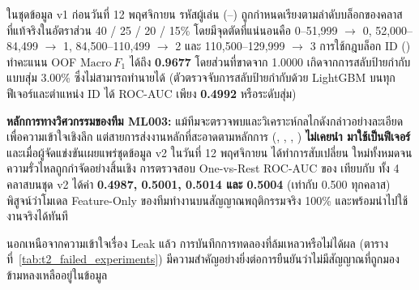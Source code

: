 \begin{warningbox}
ในชุดข้อมูล v1 ก่อนวันที่ 12 พฤศจิกายน รหัสผู้เล่น  (--) ถูกกำหนดเรียงตามลำดับบล็อกของคลาสที่แท้จริงในอัตราส่วน 40 / 25 / 20 / 15\% โดยมีจุดตัดที่แน่นอนคือ 0--51,999 $\to$ 0, 52,000--84,499 $\to$ 1, 84,500--110,499 $\to$ 2 และ 110,500--129,999 $\to$ 3 การใช้กฎบล็อก ID () ทำคะแนน OOF $\mathrm{Macro}\ F_1$ ได้ถึง \textbf{0.9677} โดยส่วนที่ขาดจาก 1.0000 เกิดจากการสลับป้ายกำกับแบบสุ่ม 3.00\% ซึ่งไม่สามารถทำนายได้ (ตัวตรวจจับการสลับป้ายกำกับด้วย LightGBM บนทุกฟีเจอร์และตำแหน่ง ID ได้ ROC-AUC เพียง \textbf{0.4992} หรือระดับสุ่ม)

\textbf{หลักการทางวิศวกรรมของทีม ML003:} แม้ทีมจะตรวจพบและวิเคราะห์กลไกดังกล่าวอย่างละเอียดเพื่อความเข้าใจเชิงลึก แต่สายการส่งงานหลักที่สะอาดตามหลักการ (, , , ) \textbf{ไม่เคยนำ  มาใช้เป็นฟีเจอร์} และเมื่อผู้จัดแข่งขันเผยแพร่ชุดข้อมูล v2 ในวันที่ 12 พฤศจิกายน ได้ทำการสับเปลี่ยน  ใหม่ทั้งหมดจนความรั่วไหลถูกกำจัดอย่างสิ้นเชิง การตรวจสอบ One-vs-Rest ROC-AUC ของ  เทียบกับ  ทั้ง 4 คลาสบนชุด v2 ได้ค่า \textbf{0.4987, 0.5001, 0.5014 และ 0.5004} (เท่ากับ 0.500 ทุกคลาส) พิสูจน์ว่าโมเดล Feature-Only ของทีมทำงานบนสัญญาณพฤติกรรมจริง 100\% และพร้อมนำไปใช้งานจริงได้ทันที
\end{warningbox}

นอกเหนือจากความเข้าใจเรื่อง  Leak แล้ว การบันทึกการทดลองที่ล้มเหลวหรือไม่ได้ผล (ตารางที่~\ref{tab:t2_failed_experiments}) มีความสำคัญอย่างยิ่งต่อการยืนยันว่าไม่มีสัญญาณที่ถูกมองข้ามหลงเหลืออยู่ในข้อมูล

